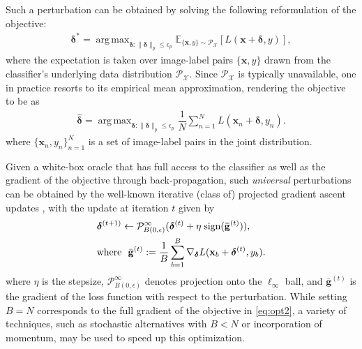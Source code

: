 \documentclass[letterpaper]{article}
\DeclareMathOperator*{\argmax}{arg\,max}
\begin{document}
	Such a perturbation can be obtained by solving the following reformulation of the objective:
	\begin{align}
	\label{eq:opt1}
	\bm{\delta}^* = \argmax_{\bm{\delta} :  \|\bm{\delta}\|_p \leq \epsilon_p} \mathbb{E}_{\{\mathbf{x},y\}\sim\mathcal{P}_{\mathcal{X}}}[L(\mathbf{x}+\bm{\delta},y)],
	\end{align}
	where the expectation is taken over image-label pairs $\{\mathbf{x},y\}$ drawn from the classifier's underlying data distribution $\mathcal{P}_{\mathcal{X}}$. Since $\mathcal{P}_{\mathcal{X}}$ is typically unavailable, one in practice resorts to its empirical mean approximation, rendering the objective to be as 
	\begin{align}
	\label{eq:opt2}
	\hat{\bm{\delta}} = \argmax_{\bm{\delta} :  \|\bm{\delta}\|_p \leq \epsilon_p} \dfrac{1}{N} \sum_{n=1}^N L(\mathbf{x}_n+\bm{\delta},y_n).
	\end{align}
	where $\{\mathbf{x}_n, y_n\}_{n=1}^N$ is a set of image-label pairs in the joint distribution.
	
	Given a white-box oracle that has full access to the classifier as well as the gradient of the objective through back-propagation, such {\emph {universal}} perturbations can be obtained by the well-known iterative (class of) projected gradient ascent updates \cite{madry2018towards}, with the update at iteration $t$ given by
	\begin{align}
	\label{eq:pgd_update}
	&\boldsymbol{\delta}^{(t+1)} \leftarrow  \mathcal{P}_{B(0,\epsilon)}^\infty (\boldsymbol{\delta}^{(t)} + \eta \; \text{sign}(\mathbf{\Bar{g}}^{(t)} )),\nonumber\\&\text{where}~~\Bar{\mathbf{g}}^{(t)} := \dfrac{1}{B}  \sum_{b=1}^{B}\nabla_{\bm{\delta}} L(\mathbf{x}_b+\boldsymbol{\delta}^{(t)},y_b).
	\end{align}
	where $\eta$ is the stepsize, $\mathcal{P}_{B(0,\epsilon)}^\infty$ denotes projection onto the $\ell_\infty$ ball, 
	and $\bar{\mathbf{g}}^{(t)}$ is the gradient of the loss function with respect to the perturbation.
	While setting $B=N$ corresponds to the full gradient of the objective in \eqref{eq:opt2},
	a variety of techniques, such as stochastic alternatives with $B<N$ or incorporation of momentum, may be used to speed up this optimization. 
	
\end{document}
